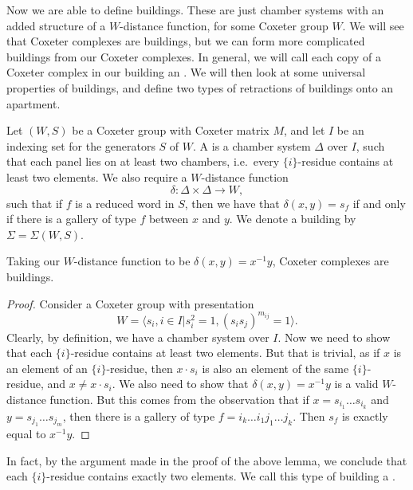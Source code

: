 \documentclass[11pt]{article}
\begin{document}
Now we are able to define buildings. These are just chamber systems with an added structure of a $W$-distance function, for some Coxeter group $W$. We will see that Coxeter complexes are buildings, but we can form more complicated buildings from our Coxeter complexes. In general, we will call each copy of a Coxeter complex in our building an . We will then look at some universal properties of buildings, and define two types of retractions of buildings onto an apartment. 

\begin{definition}
    Let $(W,S)$ be a Coxeter group with Coxeter matrix $M$, and let $I$ be an indexing set for the generators $S$ of $W$. A  is a chamber system $\Delta$ over $I$, such that each panel lies on at least two chambers, i.e.\ every $\{i\}$-residue contains at least two elements. We also require a $W$-distance function
    \[\delta:\Delta\times \Delta \to W,\]
    such that if $f$ is a reduced word in $S$, then we have that $\delta(x,y)=s_f$ if and only if there is a gallery of type $f$ between $x$ and $y$. We denote a building by $\Sigma=\Sigma(W,S)$. 
\end{definition}

\begin{lemma}\label{cox}
    Taking our $W$-distance function to be $\delta(x,y)=x^{-1}y$, Coxeter complexes are buildings.
\end{lemma}

\begin{proof}
    Consider a Coxeter group with presentation
    \[W=\langle s_i,i\in I|s_i^2=1,(s_is_j)^{m_{ij}}=1\rangle.\]
    Clearly, by definition, we have a chamber system over $I$. Now we need to show that each $\{i\}$-residue contains at least two elements. But that is trivial, as if $x$ is an element of an $\{i\}$-residue, then $x\cdot s_i$ is also an element of the same $\{i\}$-residue, and $x\neq x\cdot s_i$. 
    We also need to show that $\delta(x,y)=x^{-1}y$ is a valid $W$-distance function. But this comes from the observation that if $x=s_{i_1}\hdots  s_{i_k}$ and $y=s_{j_1}\hdots  s_{j_m}$, then there is a gallery of type $f=i_k\hdots  i_1j_1\hdots  j_k$. Then $s_f$ is exactly equal to $x^{-1}y$. 
\end{proof}

In fact, by the argument made in the proof of the above lemma, we conclude that each $\{i\}$-residue contains exactly two elements. We call this type of building a .
\end{document}
